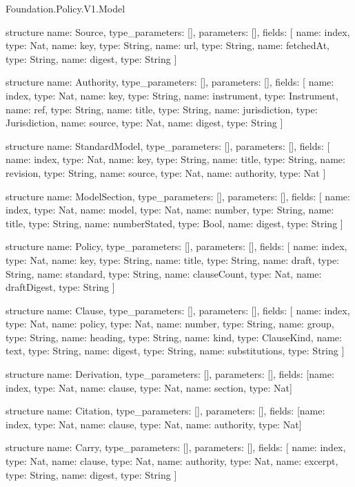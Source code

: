 \begin{lexlean}{Foundation.Policy.V1.Model}
\begin{semanticmodule}
structure{
  name: Source,
  type_parameters: [],
  parameters: [],
  fields: [
    {name: index, type: Nat},
    {name: key, type: String},
    {name: url, type: String},
    {name: fetchedAt, type: String},
    {name: digest, type: String}
  ]
}

structure{
  name: Authority,
  type_parameters: [],
  parameters: [],
  fields: [
    {name: index, type: Nat},
    {name: key, type: String},
    {name: instrument, type: Instrument},
    {name: ref, type: String},
    {name: title, type: String},
    {name: jurisdiction, type: Jurisdiction},
    {name: source, type: Nat},
    {name: digest, type: String}
  ]
}

structure{
  name: StandardModel,
  type_parameters: [],
  parameters: [],
  fields: [
    {name: index, type: Nat},
    {name: key, type: String},
    {name: title, type: String},
    {name: revision, type: String},
    {name: source, type: Nat},
    {name: authority, type: Nat}
  ]
}

structure{
  name: ModelSection,
  type_parameters: [],
  parameters: [],
  fields: [
    {name: index, type: Nat},
    {name: model, type: Nat},
    {name: number, type: String},
    {name: title, type: String},
    {name: numberStated, type: Bool},
    {name: digest, type: String}
  ]
}

structure{
  name: Policy,
  type_parameters: [],
  parameters: [],
  fields: [
    {name: index, type: Nat},
    {name: key, type: String},
    {name: title, type: String},
    {name: draft, type: String},
    {name: standard, type: String},
    {name: clauseCount, type: Nat},
    {name: draftDigest, type: String}
  ]
}

structure{
  name: Clause,
  type_parameters: [],
  parameters: [],
  fields: [
    {name: index, type: Nat},
    {name: policy, type: Nat},
    {name: number, type: String},
    {name: group, type: String},
    {name: heading, type: String},
    {name: kind, type: ClauseKind},
    {name: text, type: String},
    {name: digest, type: String},
    {name: substitutions, type: String}
  ]
}

structure{
  name: Derivation,
  type_parameters: [],
  parameters: [],
  fields: [{name: index, type: Nat}, {name: clause, type: Nat}, {name: section, type: Nat}]
}

structure{
  name: Citation,
  type_parameters: [],
  parameters: [],
  fields: [{name: index, type: Nat}, {name: clause, type: Nat}, {name: authority, type: Nat}]
}

structure{
  name: Carry,
  type_parameters: [],
  parameters: [],
  fields: [
    {name: index, type: Nat},
    {name: clause, type: Nat},
    {name: authority, type: Nat},
    {name: excerpt, type: String},
    {name: digest, type: String}
  ]
}


\end{semanticmodule}
\end{lexlean}
